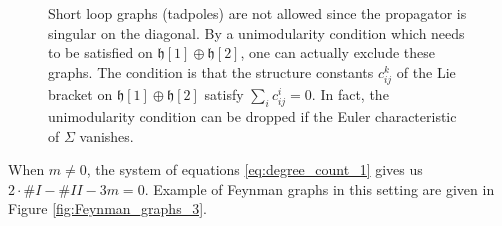 \documentclass[11pt,colorinlistoftodos]{amsart}
\numberwithin{equation}{subsection}
\theoremstyle{plain}
\theoremstyle{definition}
\theoremstyle{remark}
\begin{document}
\begin{figure}[h!]
    \centering
    \caption{Short loop graphs (tadpoles) are not allowed since the propagator is singular on the diagonal. By a unimodularity condition which needs to be satisfied on $\mathfrak{h}[1]\oplus \mathfrak{h}[2]$, one can actually exclude these graphs. The condition is that the structure constants $c^k_{ij}$ of the Lie bracket on $\mathfrak{h}[1]\oplus\mathfrak{h}[2]$ satisfy $\sum_ic^i_{ij}=0$.
    In fact, the unimodularity condition can be dropped if the Euler characteristic of $\Sigma$ vanishes.}
    \label{fig:Feynman_graphs_2}
\end{figure}

When $m\not=0$, the system of equations \eqref{eq:degree_count_1} gives us $2\cdot\#I-\#II-3m=0$. Example of Feynman graphs in this setting are given in Figure \ref{fig:Feynman_graphs_3}.
\end{document}
